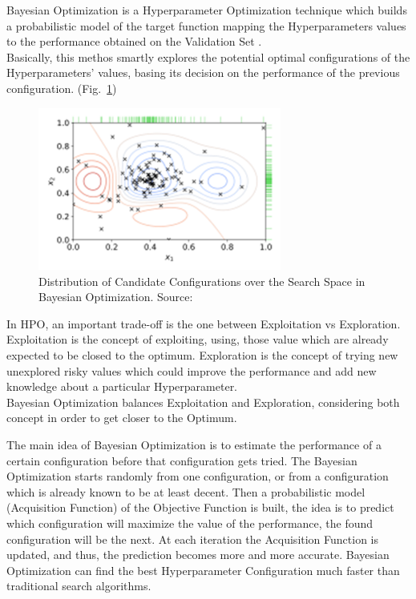 Bayesian Optimization is a Hyperparameter Optimization technique which builds a probabilistic model of the target function mapping the Hyperparameters values to the performance obtained on the Validation Set \cite{OptunaSamplers-TreeStructuredParzenEstimator}.
\\[0.3cm]Basically, this methos smartly explores the potential optimal configurations of the Hyperparameters' values, basing its decision on the performance of the previous configuration. (Fig.~\ref{fig:figure-2.2.6})
\begin{figure}[t]
	\centering
	\includegraphics[width=8cm]{figures/figure-2.2.6.png}
	\caption[Candidates Distribution in Bayesian Optimization]{Distribution of Candidate Configurations over the Search Space in Bayesian Optimization. Source:~\cite{Tesi-1.1}}
	\label{fig:figure-2.2.6}
\end{figure}

In HPO, an important trade-off is the one between Exploitation vs Exploration.
Exploitation is the concept of exploiting, using, those value which are already expected to be closed to the optimum.
Exploration is the concept of trying new unexplored risky values which could improve the performance and add new knowledge about a particular Hyperparameter.
\\[0.3cm]Bayesian Optimization balances Exploitation and Exploration, considering both concept in order to get closer to the Optimum.

The main idea of Bayesian Optimization is to estimate the performance of a certain configuration before that configuration gets tried.
The Bayesian Optimization starts randomly from one configuration, or from a configuration which is already known to be at least decent.
Then a probabilistic model (Acquisition Function) of the Objective Function is built, the idea is to predict which configuration will maximize the value of the performance, the found configuration will be the next.
At each iteration the Acquisition Function is updated, and thus, the prediction becomes more and more accurate.
Bayesian Optimization can find the best Hyperparameter Configuration much faster than traditional search algorithms.


